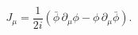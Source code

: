 \begin{equation}
J_{\mu }=\frac{1}{2i}\left( \bar{\phi}\,\partial _{\mu }\phi -\phi
\,\partial _{\mu }\bar{\phi}\right).
\end{equation}

